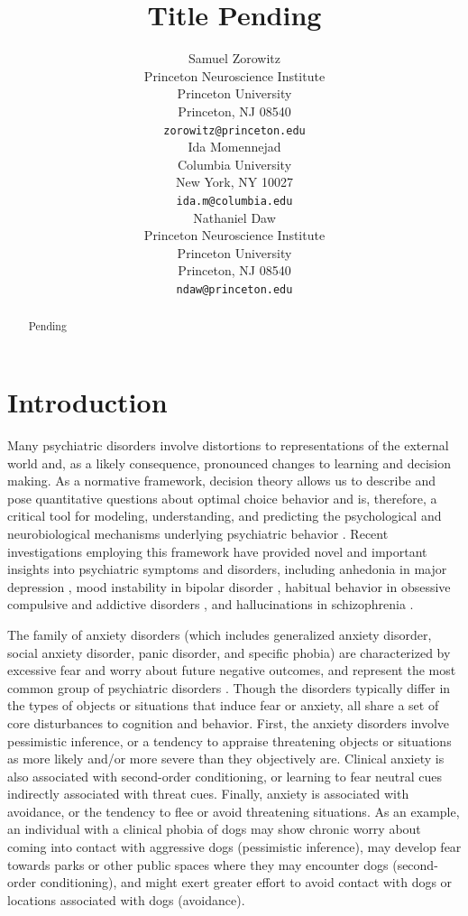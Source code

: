 \documentclass[11pt]{article} %
\title{Title Pending}
\author{
Samuel Zorowitz \\
Princeton Neuroscience Institute\\
Princeton University\\
Princeton, NJ 08540 \\
\texttt{zorowitz@princeton.edu} \\
\And
Ida Momennejad \\
Columbia University\\
New York, NY 10027 \\
\texttt{ida.m@columbia.edu} \\
\And
Nathaniel Daw \\
Princeton Neuroscience Institute\\
Princeton University\\
Princeton, NJ 08540 \\
\texttt{ndaw@princeton.edu} \\
}
\begin{document}
\maketitle

\begin{abstract}
Pending
\end{abstract}


\startmain

\section{Introduction}

Many psychiatric disorders involve distortions to representations of the external world and, as a likely consequence, pronounced changes to learning and decision making. As a normative framework, decision theory allows us to describe and pose quantita­tive questions about optimal choice behavior \citep{DayanDaw2008} and is, therefore, a critical tool for modeling, understanding, and predicting the psychological and neurobiological mechanisms underlying psychiatric behavior \citep{maia2011, HuysDawDayan2015}. Recent investigations employing this framework have provided novel and important insights into psychiatric symptoms and disorders, including anhedonia in major depression \citep{Rutledge2017}, mood instability in bipolar disorder \citep{EldarNiv2015, EldarDolanNiv2016}, habitual behavior in obsessive compulsive and addictive disorders \citep{gillan2016}, and hallucinations in schizophrenia \citep{powers2017, corlett2018}.

The family of anxiety disorders (which includes generalized anxiety disorder, social anxiety disorder, panic disorder, and specific phobia) are characterized by excessive fear and worry about future negative outcomes, and represent the most common group of psychiatric disorders \citep{kessler2009}. Though the disorders typically differ in the types of objects or situations that induce fear or anxiety, all share a set of core disturbances to cognition and behavior. First, the anxiety disorders involve pessimistic inference, or a tendency to appraise threatening objects or situations as more likely and/or more severe than they objectively are. Clinical anxiety is also associated with second-order conditioning, or learning to fear neutral cues indirectly associated with threat cues. Finally, anxiety is associated with avoidance, or the tendency to flee or avoid threatening situations. As an example, an individual with a clinical phobia of dogs may show chronic worry about coming into contact with aggressive dogs (pessimistic inference), may develop fear towards parks or other public spaces where they may encounter dogs (second-order conditioning), and might exert greater effort to avoid contact with dogs or locations associated with dogs (avoidance).
\end{document}
